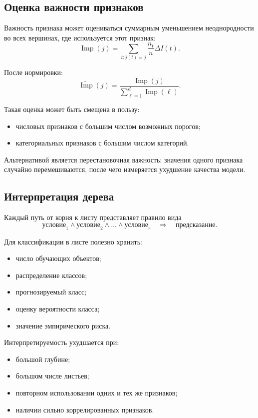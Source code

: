 \documentclass[12pt,a4paper]{article}
\theoremstyle{plain}
\theoremstyle{definition}
\theoremstyle{remark}
\begin{document}
\subsection{Оценка важности признаков}

Важность признака может оцениваться суммарным уменьшением
неоднородности во всех вершинах, где используется этот признак:
\[
    \operatorname{Imp}(j)
    =
    \sum_{t:j(t)=j}
    \frac{n_t}{n}\Delta I(t).
\]

После нормировки:
\[
    \widetilde{\operatorname{Imp}}(j)
    =
    \frac{\operatorname{Imp}(j)}
         {\sum_{\ell=1}^{d}\operatorname{Imp}(\ell)}.
\]

Такая оценка может быть смещена в пользу:
\begin{itemize}
    \item числовых признаков с большим числом возможных порогов;
    \item категориальных признаков с большим числом категорий.
\end{itemize}

Альтернативой является перестановочная важность: значения одного
признака случайно перемешиваются, после чего измеряется ухудшение
качества модели.

\subsection{Интерпретация дерева}

Каждый путь от корня к листу представляет правило вида
\[
    \text{условие}_1
    \land
    \text{условие}_2
    \land\ldots\land
    \text{условие}_r
    \quad\Longrightarrow\quad
    \text{предсказание}.
\]

Для классификации в листе полезно хранить:
\begin{itemize}
    \item число обучающих объектов;
    \item распределение классов;
    \item прогнозируемый класс;
    \item оценку вероятности класса;
    \item значение эмпирического риска.
\end{itemize}

Интерпретируемость ухудшается при:
\begin{itemize}
    \item большой глубине;
    \item большом числе листьев;
    \item повторном использовании одних и тех же признаков;
    \item наличии сильно коррелированных признаков.
\end{itemize}
\end{document}
